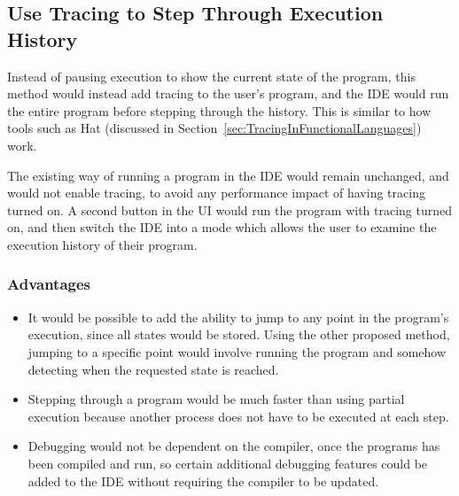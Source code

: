 \documentclass[authoryearcitations]{UoYCSproject}
\begin{document}

\subsection{Use Tracing to Step Through Execution History}
\label{sec:ProposedDesign2}

Instead of pausing execution to show the current state of the program, this
method would instead add tracing to the user's program, and the IDE would run
the entire program before stepping through the history. This is similar to how
tools such as Hat (discussed in Section~\ref{sec:TracingInFunctionalLanguages})
work.

The existing way of running a program in the IDE would remain unchanged, and
would not enable tracing, to avoid any performance impact of having tracing
turned on. A second button in the UI would run the program with tracing turned
on, and then switch the IDE into a mode which allows the user to examine the
execution history of their program.


\subsubsection{Advantages}
\label{sec:ProposedDesign2Advantages}

\begin{itemize}
    \item It would be possible to add the ability to jump to any point in the
          program's execution, since all states would be stored. Using the other
          proposed method, jumping to a specific point would involve running the
          program and somehow detecting when the requested state is reached.

    \item Stepping through a program would be much faster than using partial
          execution because another process does not have to be executed at each
          step.

    \item Debugging would not be dependent on the compiler, once the programs has
          been compiled and run, so certain additional debugging features could
          be added to the IDE without requiring the compiler to be updated. 
\end{itemize}
\end{document}
